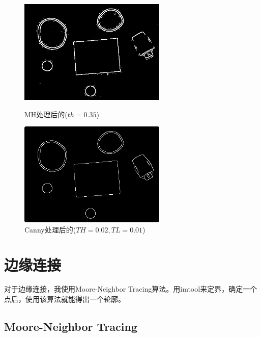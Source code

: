 \documentclass[11pt, a4paper, UTF8]{ctexart}
\begin{document}
\begin{figure}[H]
  \centering
  \begin{minipage}[t]{0.48\textwidth}
    \centering
    \includegraphics[width=7cm]{MH_alpha=0.35_rubberband_cap.png}
    \caption{MH处理后的($th=0.35$)}
    \end{minipage}
  \begin{minipage}[t]{0.48\textwidth}
  \centering
  \includegraphics[width=7cm]{Canny_TH=0.02_TL=0.01_rubberband_cap.png}
  \caption{Canny处理后的($TH=0.02,TL=0.01$)}
  \end{minipage}
\end{figure}



\section{边缘连接}



对于边缘连接，我使用Moore-Neighbor Tracing算法。用imtool来定界，确定一个点后，使用该算法就能得出一个轮廓。

\subsection{Moore-Neighbor Tracing}
\end{document}
